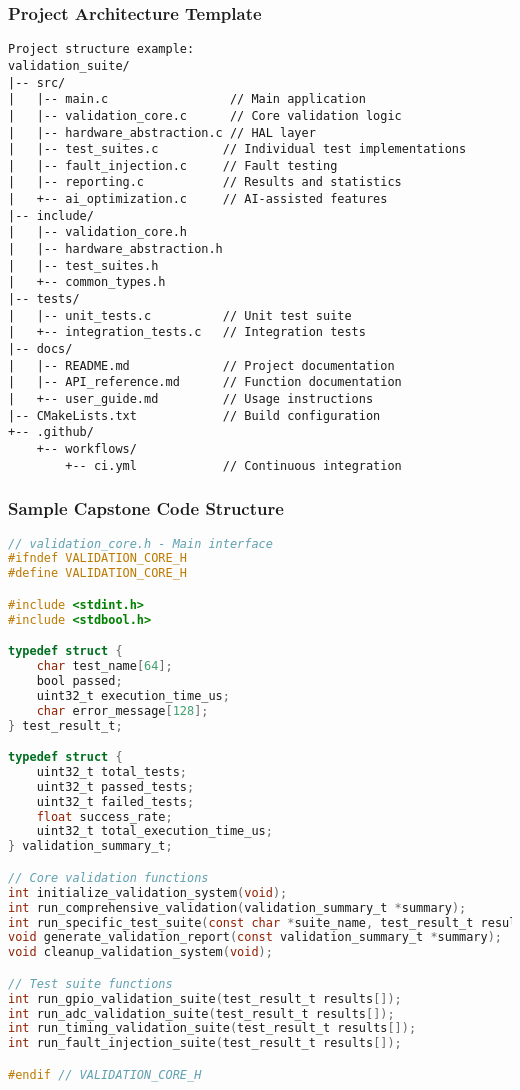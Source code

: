 \documentclass{beamer}
\begin{document}
\begin{frame}[fragile]
\frametitle{Project Architecture Template}
\begin{lstlisting}[basicstyle=\tiny\ttfamily]
Project structure example:
validation_suite/
|-- src/
|   |-- main.c                 // Main application
|   |-- validation_core.c      // Core validation logic
|   |-- hardware_abstraction.c // HAL layer
|   |-- test_suites.c         // Individual test implementations
|   |-- fault_injection.c     // Fault testing
|   |-- reporting.c           // Results and statistics
|   +-- ai_optimization.c     // AI-assisted features
|-- include/
|   |-- validation_core.h
|   |-- hardware_abstraction.h
|   |-- test_suites.h
|   +-- common_types.h
|-- tests/
|   |-- unit_tests.c          // Unit test suite
|   +-- integration_tests.c   // Integration tests
|-- docs/
|   |-- README.md             // Project documentation
|   |-- API_reference.md      // Function documentation
|   +-- user_guide.md         // Usage instructions
|-- CMakeLists.txt            // Build configuration
+-- .github/
    +-- workflows/
        +-- ci.yml            // Continuous integration
\end{lstlisting}
\end{frame}

\begin{frame}[fragile]
\frametitle{Sample Capstone Code Structure}
\begin{lstlisting}[language=C, basicstyle=\tiny]
// validation_core.h - Main interface
#ifndef VALIDATION_CORE_H
#define VALIDATION_CORE_H

#include <stdint.h>
#include <stdbool.h>

typedef struct {
    char test_name[64];
    bool passed;
    uint32_t execution_time_us;
    char error_message[128];
} test_result_t;

typedef struct {
    uint32_t total_tests;
    uint32_t passed_tests;
    uint32_t failed_tests;
    float success_rate;
    uint32_t total_execution_time_us;
} validation_summary_t;

// Core validation functions
int initialize_validation_system(void);
int run_comprehensive_validation(validation_summary_t *summary);
int run_specific_test_suite(const char *suite_name, test_result_t results[]);
void generate_validation_report(const validation_summary_t *summary);
void cleanup_validation_system(void);

// Test suite functions
int run_gpio_validation_suite(test_result_t results[]);
int run_adc_validation_suite(test_result_t results[]);
int run_timing_validation_suite(test_result_t results[]);
int run_fault_injection_suite(test_result_t results[]);

#endif // VALIDATION_CORE_H
\end{lstlisting}
\end{frame}
\end{document}
